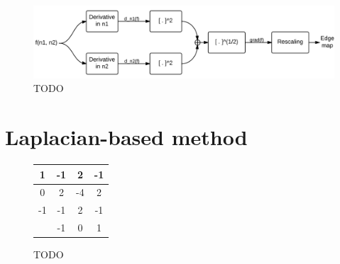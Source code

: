 \documentclass[12pt]{amsart}
\begin{document}
\begin{figure}
\centering
\includegraphics[width=\linewidth]{GradientMethod.png}
\caption{TODO}
\label{fig:TODO}
\end{figure}

\section{Laplacian-based method}

\begin{figure}
\centering
\begin{tabular}{c || c | c | c }
1 & -1 & 2 & -1 \\
\hline
0 & 2 & -4 & 2 \\
\hline
-1 & -1 & 2 & -1 \\
\hline\hline
& -1 & 0 & 1 \\
\end{tabular}
\caption{TODO}
\label{fig:TODO}
\end{figure}
\end{document}
